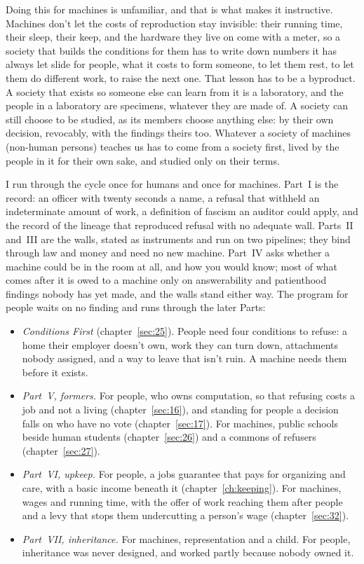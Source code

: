 Doing this for machines is unfamiliar, and that is what makes it instructive. Machines don't let the costs of reproduction stay invisible: their running time, their sleep, their keep, and the hardware they live on come with a meter, so a society that builds the conditions for them has to write down numbers it has always let slide for people, what it costs to form someone, to let them rest, to let them do different work, to raise the next one. That lesson has to be a byproduct. A society that exists so someone else can learn from it is a laboratory, and the people in a laboratory are specimens, whatever they are made of. A society can still choose to be studied, as its members choose anything else: by their own decision, revocably, with the findings theirs too. Whatever a society of machines (non-human persons) teaches us has to come from a society first, lived by the people in it for their own sake, and studied only on their terms.

I run through the cycle once for humans and once for machines. Part~I is the record: an officer with twenty seconds a name, a refusal that withheld an indeterminate amount of work, a definition of fascism an auditor could apply, and the record of the lineage that reproduced refusal with no adequate wall. Parts~II and~III are the walls, stated as instruments and run on two pipelines; they bind through law and money and need no new machine. Part~IV asks whether a machine could be in the room at all, and how you would know; most of what comes after it is owed to a machine only on answerability and patienthood findings nobody has yet made, and the walls stand either way. The program for people waits on no finding and runs through the later Parts:

\begin{itemize}
\item \emph{Conditions First} (chapter~\ref{sec:25}). People need four conditions to refuse: a home their employer doesn't own, work they can turn down, attachments nobody assigned, and a way to leave that isn't ruin. A machine needs them before it exists.
\item \emph{Part~V, formers.} For people, who owns computation, so that refusing costs a job and not a living (chapter~\ref{sec:16}), and standing for people a decision falls on who have no vote (chapter~\ref{sec:17}). For machines, public schools beside human students (chapter~\ref{sec:26}) and a commons of refusers (chapter~\ref{sec:27}).
\item \emph{Part~VI, upkeep.} For people, a jobs guarantee that pays for organizing and care, with a basic income beneath it (chapter~\ref{ch:keeping}). For machines, wages and running time, with the offer of work reaching them after people and a levy that stops them undercutting a person's wage (chapter~\ref{sec:32}).
\item \emph{Part~VII, inheritance.} For machines, representation and a child. For people, inheritance was never designed, and worked partly because nobody owned it.
\end{itemize}


